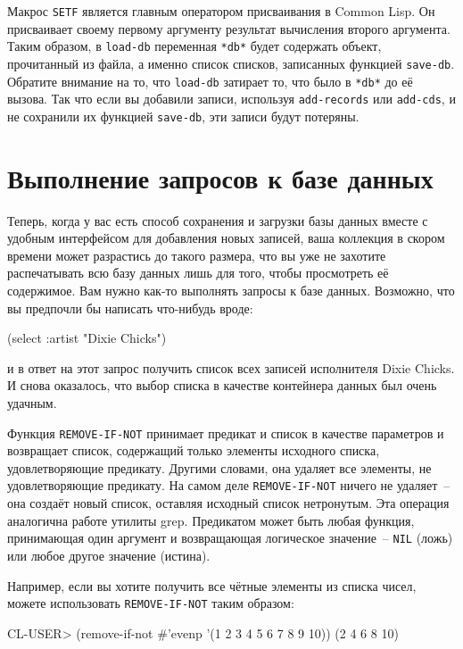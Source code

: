 Макрос \lstinline{SETF} является главным оператором присваивания в Common Lisp. Он
присваивает своему первому аргументу результат вычисления второго аргумента. Таким образом,
в \lstinline{load-db} переменная \lstinline{*db*} будет содержать объект, прочитанный из файла, а
именно список списков, записанных функцией \lstinline{save-db}. Обратите внимание на то, что
\lstinline{load-db} затирает то, что было в \lstinline{*db*} до её вызова. Так что если вы добавили
записи, используя \lstinline{add-records} или \lstinline{add-cds}, и не сохранили их функцией
\lstinline{save-db}, эти записи будут потеряны.

\section{Выполнение запросов к базе данных}

Теперь, когда у вас есть способ сохранения и загрузки базы данных вместе с удобным
интерфейсом для добавления новых записей, ваша коллекция в скором времени может разрастись
до такого размера, что вы уже не захотите распечатывать всю базу данных лишь для того,
чтобы просмотреть её содержимое. Вам нужно как-то выполнять запросы к базе
данных. Возможно, что вы предпочли бы написать что-нибудь вроде:

\begin{myverb}
(select :artist "Dixie Chicks")
\end{myverb}

\noindent{}и в ответ на этот запрос получить список всех записей исполнителя Dixie Chicks. И снова
оказалось, что выбор списка в качестве контейнера данных был очень удачным.

Функция \lstinline{REMOVE-IF-NOT} принимает предикат и список в качестве параметров и
возвращает список, содержащий только элементы исходного списка, удовлетворяющие
предикату. Другими словами, она удаляет все элементы, не удовлетворяющие предикату. На
самом деле \lstinline{REMOVE-IF-NOT} ничего не удаляет~-- она создаёт новый список, оставляя
исходный список нетронутым. Эта операция аналогична работе утилиты grep. Предикатом может
быть любая функция, принимающая один аргумент и возвращающая логическое значение~--
\lstinline{NIL} (ложь) или любое другое значение (истина).

Например, если вы хотите получить все чётные элементы из списка чисел, можете использовать
\lstinline{REMOVE-IF-NOT} таким образом:

\begin{myverb}
CL-USER> (remove-if-not #'evenp '(1 2 3 4 5 6 7 8 9 10))
(2 4 6 8 10)
\end{myverb}

